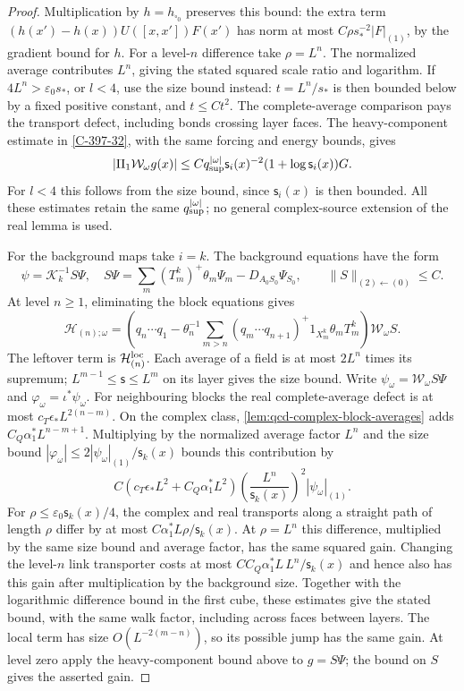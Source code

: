 \documentclass[11pt,letterpaper,reqno]{amsart}
\theoremstyle{definition}
\theoremstyle{remark}
\begin{document}
\begin{proof}
Multiplication by $h=h_{\square_0}$ preserves this bound: the extra
term $(h(x')-h(x))U([x,x'])F(x')$ has norm at most
$C\rho s_*^{-2}|F|_{(1)}$, by the gradient bound for $h$.
For a level-$n$ difference take $\rho=L^n$. The normalized
average contributes $L^n$, giving the stated squared scale ratio
and logarithm. If $4L^n>\varepsilon_0s_*$, or $l<4$, use the size
bound instead: $t=L^n/s_*$ is then bounded below by a fixed positive
constant, and $t\le Ct^2$. The complete-average comparison pays
the transport defect, including bonds crossing layer faces.
The heavy-component estimate in \cref{C-397-32}, with the same forcing
and energy bounds, gives
\[
 |\Pi_1\mathcal W_\omega g(x)|
 \le Cq_{\rm sup}^{|\omega|}\mathsf s_i(x)^{-2}
              (1+\log\mathsf s_i(x))G.
\]
For $l<4$ this follows from the size bound, since $\mathsf s_i(x)$
is then bounded.
All these estimates retain the same $q_{\rm sup}^{|\omega|}$;
no general complex-source extension of the real lemma is used.

For the background maps take $i=k$. The background equations have the form
\[
 \psi=\mathcal K_k^{-1}S\Psi,
 \quad S\Psi=\sum_m(T_m^k)^+\theta_m\Psi_m-D_{A_0S_0}\Psi_{S_0},
 \qquad\|S\|_{(2)\leftarrow(0)}\le C.
\]
At level $n\ge1$, eliminating the block equations gives
\[
 \mathcal H_{(n);\omega}=
 \left(q_n\cdots q_1-\theta_n^{-1}
 \sum_{m>n}(q_m\cdots q_{n+1})^+
                     1_{X_m^k}\theta_mT_m^k\right)
                 \mathcal W_\omega S.
\]
The leftover term is $\mathcal H^{\rm loc}_{(n)}$.
Each average of a field is at most $2L^n$ times its supremum;
$L^{m-1}\le\mathsf s\le L^m$ on its layer gives the size bound.
Write $\psi_\omega=\mathcal W_\omega S\Psi$ and
$\varphi_\omega=\iota^*\psi_\omega$.
For neighbouring blocks the real complete-average defect is at most
$c_T\epsilon_*L^{2(n-m)}$. On the complex class,
\cref{lem:qcd-complex-block-averages} adds
$C_Q\alpha_1^*L^{n-m+1}$. Multiplying by the normalized average
factor $L^n$ and the size bound
$|\varphi_\omega|\le2|\psi_\omega|_{(1)}/\mathsf s_k(x)$
bounds this contribution by
\[
 C(c_T\epsilon_*L^2+C_Q\alpha_1^*L^2)
 \left(\frac{L^n}{\mathsf s_k(x)}\right)^2
 |\psi_\omega|_{(1)}.
\]
For $\rho\le\varepsilon_0\mathsf s_k(x)/4$, the complex and
real transports along a straight path of length $\rho$ differ by at most
$C\alpha_1^*L\rho/\mathsf s_k(x)$. At $\rho=L^n$ this
difference, multiplied by the same size bound and average factor,
has the same squared gain. Changing the level-$n$ link transporter
costs at most $CC_Q\alpha_1^*L\,L^n/\mathsf s_k(x)$ and hence
also has this gain after multiplication by the background size.
Together with the logarithmic difference bound in the first cube,
these estimates give the stated bound, with the same walk factor,
including across faces between layers. The local term has size
$O(L^{-2(m-n)})$, so
its possible jump has the same gain.  At level zero apply the
heavy-component bound above to $g=S\Psi$; the bound on $S$ gives
the asserted gain.


\end{proof}
\end{document}
